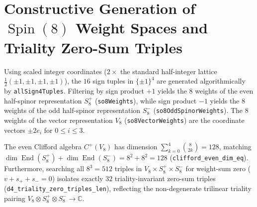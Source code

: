 \documentclass[11pt,a4paper]{article}
\begin{document}
\section{Constructive Generation of \texorpdfstring{$\operatorname{Spin}(8)$}{Spin(8)} Weight Spaces and Triality Zero-Sum Triples}

Using scaled integer coordinates ($2\times$ the standard half-integer lattice $\frac{1}{2}(\pm 1, \pm 1, \pm 1, \pm 1)$), the $16$ sign tuples in $\{\pm 1\}^4$ are generated algorithmically by \texttt{allSign4Tuples}. Filtering by sign product $+1$ yields the $8$ weights of the even half-spinor representation $S^+_8$ (\texttt{so8Weights}), while sign product $-1$ yields the $8$ weights of the odd half-spinor representation $S^-_8$ (\texttt{so8OddSpinorWeights}). The $8$ weights of the vector representation $V_8$ (\texttt{so8VectorWeights}) are the coordinate vectors $\pm 2 e_i$ for $0 \le i \le 3$.

The even Clifford algebra $C^+(V_8)$ has dimension $\sum_{k=0}^4 \binom{8}{2k} = 128$, matching $\dim \operatorname{End}(S^+_8) + \dim \operatorname{End}(S^-_8) = 8^2 + 8^2 = 128$ (\texttt{clifford\_even\_dim\_eq}). Furthermore, searching all $8^3 = 512$ triples in $V_8 \times S^+_8 \times S^-_8$ for weight-sum zero ($v + s_+ + s_- = 0$) isolates exactly $32$ triality-invariant zero-sum triples (\texttt{d4\_triality\_zero\_triples\_len}), reflecting the non-degenerate trilinear triality pairing $V_8 \otimes S^+_8 \otimes S^-_8 \to \mathbb{C}$.
\end{document}
